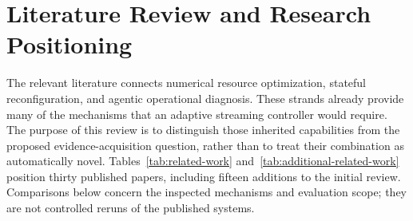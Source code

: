 \section{Literature Review and Research Positioning}
\label{sec:literature-review}
The relevant literature connects numerical resource optimization, stateful reconfiguration, and agentic operational diagnosis. These strands already provide many of the mechanisms that an adaptive streaming controller would require. The purpose of this review is to distinguish those inherited capabilities from the proposed evidence-acquisition question, rather than to treat their combination as automatically novel. Tables~\ref{tab:related-work} and~\ref{tab:additional-related-work} position thirty published papers, including fifteen additions to the initial review. Comparisons below concern the inspected mechanisms and evaluation scope; they are not controlled reruns of the published systems.

